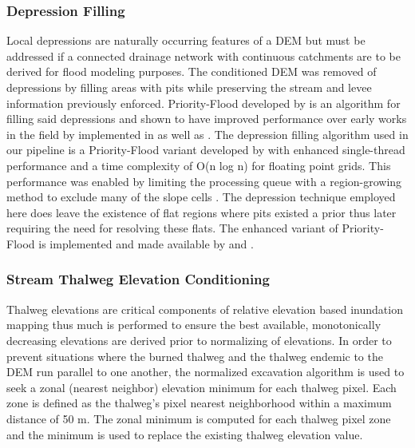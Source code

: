 \documentclass[draft]{dependencies/agujournal2019}
\begin{document}
\subsubsection{Depression Filling}
\label{sssec:depression_filling}
%
Local depressions are naturally occurring features of a DEM but must be addressed if a connected drainage network with continuous catchments are to be derived for flood modeling purposes.
The conditioned DEM was removed of depressions by filling areas with pits while preserving the stream and levee information previously enforced.
Priority-Flood developed by  is an algorithm for filling said depressions and shown to have improved performance over early works in the field by  implemented in  as well as .
The depression filling algorithm used in our pipeline is a Priority-Flood variant developed by \cite{zhou2016efficient} with enhanced single-thread performance and a time complexity of O(n log n) for floating point grids.
This performance was enabled by limiting the processing queue with a region-growing method to exclude many of the slope cells \cite{zhou2016efficient}.
The depression technique employed here does leave the existence of flat regions where pits existed a prior thus later requiring the need for resolving these flats.
The enhanced variant of Priority-Flood is implemented and made available by  and .
%
\subsubsection{Stream Thalweg Elevation Conditioning}
\label{sssec:stream_thalweg_elevation_conditioning}
%
Thalweg elevations are critical components of relative elevation based inundation mapping thus much is performed to ensure the best available, monotonically decreasing elevations are derived prior to normalizing of elevations.
In order to prevent situations where the burned thalweg and the thalweg endemic to the DEM run parallel to one another, the normalized excavation algorithm \cite{saunders1999preparation} is used to seek a zonal (nearest neighbor) elevation minimum for each thalweg pixel. 
Each zone is defined as the thalweg's pixel nearest neighborhood within a maximum distance of 50 m.
The zonal minimum is computed for each thalweg pixel zone and the minimum is used to replace the existing thalweg elevation value.
\end{document}

